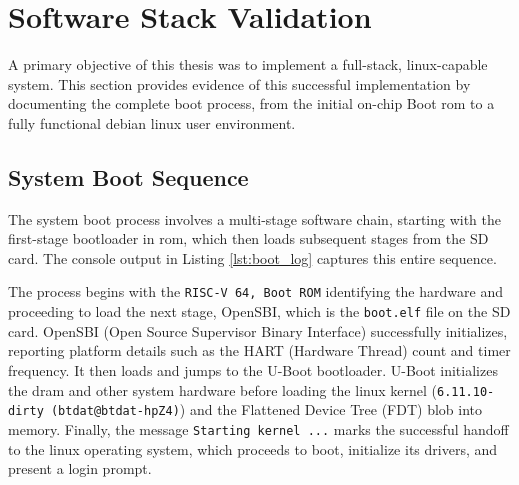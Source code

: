 \FloatBarrier

\section{Software Stack Validation}
\label{sec:software_results}
A primary objective of this thesis was to implement a full-stack, \acrshort{linux}-capable system. This section provides evidence of this successful implementation by documenting the complete boot process, from the initial on-chip Boot \acrshort{rom} to a fully functional \acrshort{debian} \acrshort{linux} user environment.

\subsection{System Boot Sequence}
The system boot process involves a multi-stage software chain, starting with the first-stage bootloader in \acrshort{rom}, which then loads subsequent stages from the SD card. The console output in Listing \ref{lst:boot_log} captures this entire sequence.

The process begins with the \texttt{RISC-V 64, Boot ROM} identifying the hardware and proceeding to load the next stage, OpenSBI, which is the \texttt{boot.elf} file on the SD card. OpenSBI (Open Source Supervisor Binary Interface) successfully initializes, reporting platform details such as the HART (Hardware Thread) count and timer frequency. It then loads and jumps to the U-Boot bootloader. U-Boot initializes the \acrshort{dram} and other system hardware before loading the \acrshort{linux} kernel (\texttt{6.11.10-dirty (btdat@btdat-hpZ4)}) and the Flattened Device Tree (FDT) blob into memory. Finally, the message \texttt{Starting kernel ...} marks the successful handoff to the \acrshort{linux} operating system, which proceeds to boot, initialize its drivers, and present a login prompt.


